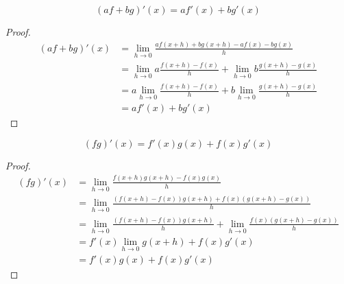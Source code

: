 \begin{theorem}
  $$\left( af+bg \right)'\left( x \right)=af'\left( x \right)+bg'\left( x \right)$$
\end{theorem}
\begin{proof}
  \begin{align*}
    \left( af+bg \right)'\left( x \right) & =\lim_{h\to0}\frac{af\left( x+h \right)+bg\left( x+h \right)-af\left( x \right)-bg\left( x \right)}{h}                     \\
                                          & =\lim_{h\to0}a\frac{f\left( x+h \right)-f\left( x \right)}{h}+\lim_{h\to0}b\frac{g\left( x+h \right)-g\left( x \right)}{h} \\
                                          & =a\lim_{h\to0}\frac{f\left( x+h \right)-f\left( x \right)}{h}+b\lim_{h\to0}\frac{g\left( x+h \right)-g\left( x \right)}{h} \\
                                          & =af'\left( x \right)+bg'\left( x \right)                                                                                   
  \end{align*}
\end{proof}

\begin{theorem}
  $$\left( fg \right)'\left( x \right)=f'\left( x \right)g\left( x \right)+f\left( x \right)g'\left( x \right)$$
\end{theorem}
\begin{proof}
  \begin{align*}
    \left( fg \right)'\left( x \right) & =\lim_{h\to0}\frac{f\left( x+h \right)g\left( x+h \right)-f\left( x \right)g\left( x \right)}{h}                                                                                           \\
                                       & =\lim_{h\to0}\frac{\left( f\left( x+h \right)-f\left( x \right) \right)g\left( x+h \right)+f\left( x \right)\left( g\left( x+h \right)-g\left( x \right) \right)}{h}                       \\
                                       & =\lim_{h\to0}\frac{\left( f\left( x+h \right)-f\left( x \right) \right)g\left( x+h \right)}{h}+\lim_{h\to0}\frac{f\left( x \right)\left( g\left( x+h \right)-g\left( x \right) \right)}{h} \\
                                       & =f'\left( x \right)\lim_{h\to0}g\left( x+h \right)+f\left( x \right)g'\left( x \right)                                                                                                     \\
                                       & =f'\left( x \right)g\left( x \right)+f\left( x \right)g'\left( x \right)                                                                                                                   
  \end{align*}
\end{proof}

